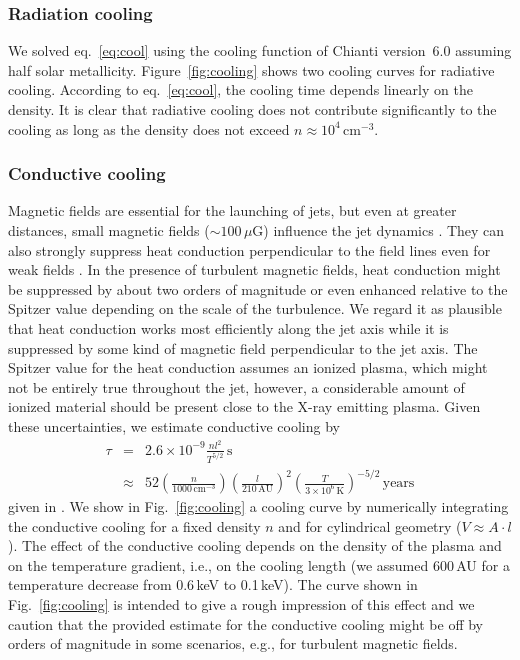 \subsubsection{Radiation cooling}
We solved eq.~\ref{eq:cool} using the cooling function of Chianti version~6.0 \citep{Dere_1997,Dere_2009} assuming half solar metallicity.
Figure~\ref{fig:cooling} shows two cooling curves for radiative cooling. According to eq.~\ref{eq:cool}, the cooling time depends linearly on the density. It is clear that radiative cooling does not contribute significantly to the cooling as long as the density does not exceed $n\approx10^4\,$cm$^{-3}$.

\subsubsection{Conductive cooling}
Magnetic fields are essential for the launching of jets, but even at greater distances, small magnetic fields ($\sim 100\,\mu$G) influence the jet dynamics \citep[][]{Hartigan_2007}. They can also strongly suppress heat conduction perpendicular to the field lines even for weak fields \citep[$\sim 1\mu\;$G, see eq. 5-53 in ][]{Spitzer_1962}. In the presence of turbulent magnetic fields, heat conduction might be suppressed by about two orders of magnitude or even enhanced relative to the Spitzer value \citep[e.g.][]{Narayan_2001,Cho_2003,Lazarian_2006} depending on the scale of the turbulence. We regard it as plausible that heat conduction works most efficiently along the jet axis while it is suppressed by some kind of magnetic field 
perpendicular to the jet axis. The Spitzer value for the heat conduction assumes an ionized plasma, which might not be entirely true throughout the jet, however, a considerable amount of ionized material should be present close to the X-ray emitting plasma.
Given these uncertainties, we estimate conductive cooling by 
\begin{eqnarray}
\tau&=&2.6\times10^{-9}\frac{n l^2}{T^{5/2}} \,\mbox{s}\\
    &\approx& 52 \left(\frac{n}{1000\,\mbox{cm}^{-3}}\right) \left(\frac{l}{210\,\mbox{AU}}\right)^2 \left( \frac{T}{3\times10^6\,\mbox{K}}\right)^{-5/2}\,\mbox{years} 
\end{eqnarray}
given in \citet{Orlando_2005}. We show in Fig.~\ref{fig:cooling} a cooling curve by numerically integrating the conductive cooling for a fixed density $n$ and for
cylindrical geometry ($V\approx A\cdot l$).
The effect of the conductive cooling depends on the density of the plasma and on the temperature gradient, i.e., on the cooling length (we assumed 600\,AU for a temperature decrease from 0.6\,keV to 0.1\,keV). The curve shown in Fig.~\ref{fig:cooling} is intended to give a rough impression of this effect and we caution that the provided estimate for the conductive cooling might be off by orders of magnitude in some scenarios, e.g., for turbulent magnetic fields.

